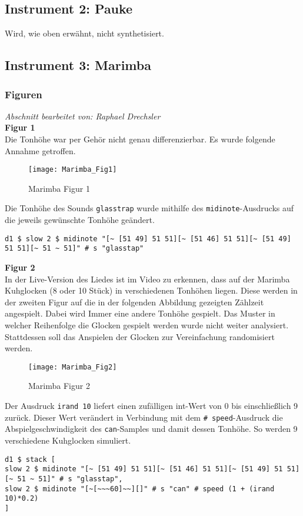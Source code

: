 \documentclass[
10pt, %
a4paper, %
oneside, %
headinclude,footinclude, %
BCOR5mm, %
]{scrartcl}
\begin{document}
\subsection{Instrument 2: Pauke}
Wird, wie oben erwähnt, nicht synthetisiert.

\subsection{Instrument 3: Marimba}
\subsubsection{Figuren}
\textit{Abschnitt bearbeitet von: Raphael Drechsler}\\

\noindent \textbf{Figur 1}\\
Die Tonhöhe war per Gehör nicht genau differenzierbar. Es wurde folgende Annahme getroffen.
\begin{figure}[h]
	\centering 
	\texttt{[image: Marimba\_Fig1]} 
	\caption{Marimba Figur 1}
\end{figure}

\noindent Die Tonhöhe des Sounds \verb|glasstrap| wurde mithilfe des \verb|midinote|-Ausdrucks \cite{tid6} auf die jeweils gewünschte Tonhöhe geändert.
\begin{lstlisting}
d1 $ slow 2 $ midinote "[~ [51 49] 51 51][~ [51 46] 51 51][~ [51 49] 51 51][~ 51 ~ 51]" # s "glasstap"
\end{lstlisting}


\noindent \textbf{Figur 2}\\
In der Live-Version des Liedes ist im Video zu erkennen, dass auf der Marimba Kuhglocken (8 oder 10 Stück) in verschiedenen Tonhöhen liegen. Diese werden in der zweiten Figur auf die in der folgenden Abbildung gezeigten Zählzeit angespielt. Dabei wird Immer eine andere Tonhöhe gespielt. Das Muster in welcher Reihenfolge die Glocken gespielt werden wurde nicht weiter analysiert. Stattdessen soll das Anspielen der Glocken zur Vereinfachung randomisiert werden.
\begin{figure}[h]
	\centering 
	\texttt{[image: Marimba\_Fig2]} 
	\caption{Marimba Figur 2}
\end{figure}

\noindent Der Ausdruck \verb|irand 10| \cite{tid7} liefert einen zufälligen int-Wert von 0 bis einschließlich 9 zurück. Dieser Wert verändert in Verbindung mit dem \verb|# speed|-Ausdruck\cite{tid8} die Abspielgeschwindigkeit des \verb|can|-Samples und damit dessen Tonhöhe. So werden 9 verschiedene Kuhglocken simuliert.
\begin{lstlisting}
d1 $ stack [
slow 2 $ midinote "[~ [51 49] 51 51][~ [51 46] 51 51][~ [51 49] 51 51][~ 51 ~ 51]" # s "glasstap",
slow 2 $ midinote "[~[~~~60]~~][]" # s "can" # speed (1 + (irand 10)*0.2)
]
\end{lstlisting} 
\end{document}
